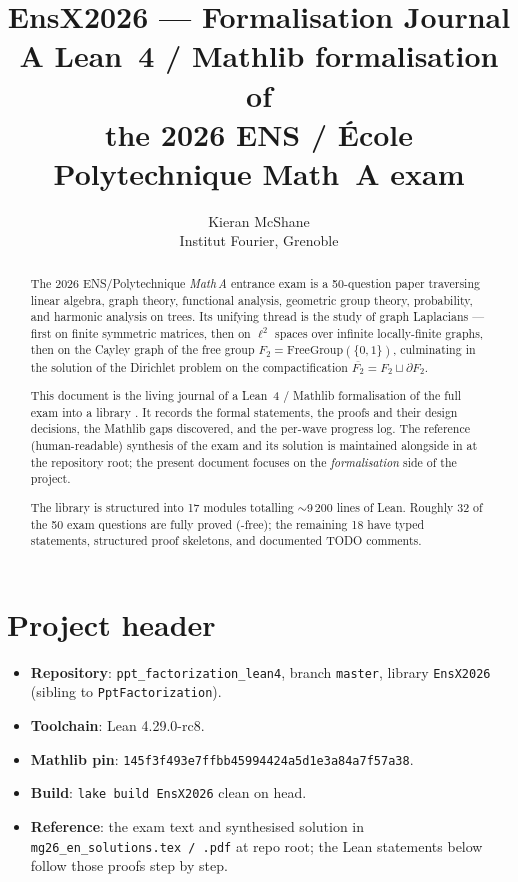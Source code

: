 \documentclass[11pt,a4paper]{article}
\title{\textbf{EnsX2026 --- Formalisation Journal}\\[0.4em]
\large A Lean~4 / Mathlib formalisation of\\
the 2026 ENS / \'Ecole Polytechnique Math~A exam}
\author{Kieran McShane \\ Institut Fourier, Grenoble}
\newcommand{\cmd}[1]{\texttt{\small #1}}
\newcommand{\BFG}{\partial F_2}
\newcommand{\cpt}{\overline{F_2}}
\theoremstyle{plain}
\theoremstyle{definition}
\begin{document}
\maketitle

\begin{abstract}
\noindent The 2026 ENS/Polytechnique \emph{Math\,A} entrance exam is a 50-question
paper traversing linear algebra, graph theory, functional analysis,
geometric group theory, probability, and harmonic analysis on trees.
Its unifying thread is the study of graph Laplacians --- first on
finite symmetric matrices, then on $\ell^2$ spaces over infinite
locally-finite graphs, then on the Cayley graph of the free group
$F_2 = \text{FreeGroup}(\{0,1\})$, culminating in the solution of the
Dirichlet problem on the compactification $\cpt = F_2 \sqcup \BFG$.

This document is the living journal of a Lean~4 / Mathlib formalisation
of the full exam into a library . It records the formal
statements, the proofs and their design decisions, the Mathlib gaps
discovered, and the per-wave progress log. The reference
(human-readable) synthesis of the exam and its solution is maintained
alongside in  at the repository
root; the present document focuses on the \emph{formalisation} side of
the project.

The library is structured into 17 modules totalling $\sim$9\,200 lines
of Lean. Roughly 32 of the 50 exam questions are fully proved
(-free); the remaining 18 have typed statements, structured
proof skeletons, and documented TODO comments.
\end{abstract}

\tableofcontents
\bigskip

\section{Project header}

\begin{itemize}[leftmargin=1.3em]
  \item \textbf{Repository}: \cmd{ppt\_factorization\_lean4}, branch
        \cmd{master}, library \cmd{EnsX2026} (sibling to
        \cmd{PptFactorization}).
  \item \textbf{Toolchain}: Lean 4.29.0-rc8.
  \item \textbf{Mathlib pin}:
        \cmd{145f3f493e7ffbb45994424a5d1e3a84a7f57a38}.
  \item \textbf{Build}: \cmd{lake build EnsX2026} clean on head.
  \item \textbf{Reference}: the exam text and synthesised solution
        in \cmd{mg26\_en\_solutions.tex / .pdf} at repo root; the
        Lean statements below follow those proofs step by step.
\end{itemize}
\end{document}

